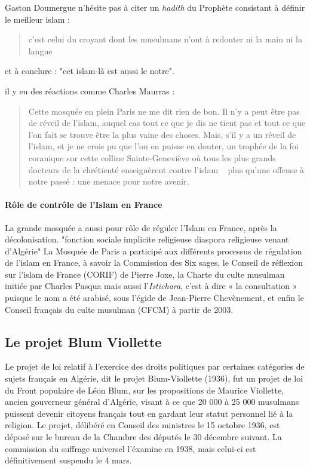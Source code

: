 Gaston Doumergue n'hésite pas à citer un \emph{hadith} du Prophète consistant à définir le meilleur islam : 
\begin{quote}
    c'est celui du croyant dont les musulmans n'ont à redouter ni la main ni la langue
\end{quote}
et à conclure : "cet islam-là est aussi le notre".


il y eu des réactions comme Charles Maurras : 
\begin{quote}
    Cette mosquée en plein Paris ne me dit rien de
bon. Il n'y a peut être pas de réveil de l'islam, auquel cas tout ce
que je dis ne tient pas et tout ce que l'on fait se trouve être la plus vaine des choses. Mais, s'il y a un réveil de l'islam, et je ne
crois pu que l'on en puisse en douter, un trophée de la foi coranique sur cette colline Sainte-Geneviève où tous les plus grands docteurs
de la chrétienté enseignèrent contre l'islam ~ plus
qu'une offense à notre passé : une menace pour notre avenir. 
\end{quote}

\paragraph{Rôle de contrôle de l'Islam en France} La grande mosquée a aussi pour rôle de réguler l'Islam en France, après la décolonisation. "fonction sociale implicite religieuse diaspora religieuse venant d'Algérie" 
La Mosquée de Paris a participé aux différents
processus de régulation de l’islam en France, à
savoir la Commission des Six sages, le Conseil
de réflexion sur l’islam de France (CORIF) de
Pierre Joxe, la Charte du culte musulman initiée
par Charles Pasqua mais aussi l’\emph{Istichara}, c’est à
dire « la consultation » puisque le nom a été
arabisé, sous l’égide de Jean-Pierre
Chevènement, et enfin le Conseil français du
culte musulman (CFCM) à partir de 2003.
\subsection{Le projet Blum Viollette}
Le projet de loi relatif à l'exercice des droits politiques par certaines catégories de sujets français en Algérie, dit le projet Blum-Viollette (1936), fut un projet de loi du Front populaire de Léon Blum, sur les propositions de Maurice Viollette, ancien gouverneur général d'Algérie, visant à ce que 20 000 à 25 000 musulmans puissent devenir citoyens français tout en gardant leur statut personnel lié à la religion. Le projet, délibéré en Conseil des ministres le 15 octobre 1936, est déposé sur le bureau de la Chambre des députés le 30 décembre suivant. La commission du suffrage universel l'éxamine en 1938, mais celui-ci est définitivement suspendu le 4 mars.

